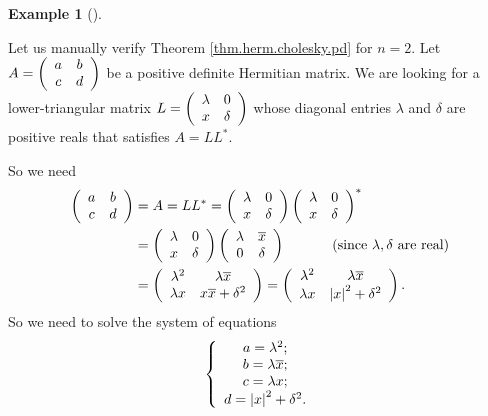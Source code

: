 \documentclass[numbers=enddot,12pt,final,onecolumn,notitlepage]{scrartcl}%
\numberwithin{exer}{subsection}
\theoremstyle{definition}
\newtheorem{exam}[theo]{Example}
\newenvironment{example}[1][]
{\begin{exam}[#1]\begin{leftbar}}
{\end{leftbar}\end{exam}}
\begin{document}
\begin{example}
Let us manually verify Theorem \ref{thm.herm.cholesky.pd} for $n=2$. Let
$A=\left(
\begin{array}
[c]{cc}%
a & b\\
c & d
\end{array}
\right)  $ be a positive definite Hermitian matrix. We are looking for a
lower-triangular matrix $L=\left(
\begin{array}
[c]{cc}%
\lambda & 0\\
x & \delta
\end{array}
\right)  $ whose diagonal entries $\lambda$ and $\delta$ are positive reals
that satisfies $A=LL^{\ast}$.

So we need%
\begin{align*}
\left(
\begin{array}
[c]{cc}%
a & b\\
c & d
\end{array}
\right)   &  =A=LL^{\ast}=\left(
\begin{array}
[c]{cc}%
\lambda & 0\\
x & \delta
\end{array}
\right)  \left(
\begin{array}
[c]{cc}%
\lambda & 0\\
x & \delta
\end{array}
\right)  ^{\ast}\\
&  =\left(
\begin{array}
[c]{cc}%
\lambda & 0\\
x & \delta
\end{array}
\right)  \left(
\begin{array}
[c]{cc}%
\lambda & \overline{x}\\
0 & \delta
\end{array}
\right)  \ \ \ \ \ \ \ \ \ \ \left(  \text{since }\lambda,\delta\text{ are
real}\right) \\
&  =\left(
\begin{array}
[c]{cc}%
\lambda^{2} & \lambda\overline{x}\\
\lambda x & x\overline{x}+\delta^{2}%
\end{array}
\right)  =\left(
\begin{array}
[c]{cc}%
\lambda^{2} & \lambda\overline{x}\\
\lambda x & \left\vert x\right\vert ^{2}+\delta^{2}%
\end{array}
\right)  .
\end{align*}
So we need to solve the system of equations%
\[
\left\{
\begin{array}
[c]{c}%
a=\lambda^{2};\\
b=\lambda\overline{x};\\
c=\lambda x;\\
d=\left\vert x\right\vert ^{2}+\delta^{2}.
\end{array}
\right.
\]



\end{example}
\end{document}
